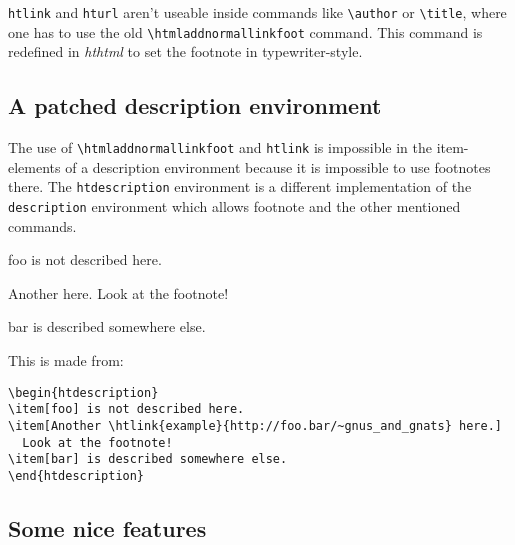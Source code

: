 \documentclass[11pt,a4paper]{article}
\begin{document}
\verb|htlink| and \verb|hturl| aren't useable inside commands like
\verb|\author| or \verb|\title|, where one has to use the old
\verb|\htmladdnormallinkfoot| command.  This command is redefined in
\emph{hthtml} to set the footnote in typewriter-style.

\subsection{A patched description environment}

The use of \verb|\htmladdnormallinkfoot| and \verb|htlink| is
impossible in the item-elements of a description environment because
it is impossible to use footnotes there.  The \verb|htdescription|
environment is a different implementation of the \verb|description|
environment which allows footnote and the other mentioned commands.

\begin{htdescription}
\item[foo] is not described here.
\item[Another \htlink{example}{http://foo.bar/~gnus_and_gnats} here.]
  Look at the footnote!
\item[bar] is described somewhere else.
\end{htdescription}

This is made from:
\begin{verbatim}
\begin{htdescription}
\item[foo] is not described here.
\item[Another \htlink{example}{http://foo.bar/~gnus_and_gnats} here.]
  Look at the footnote!
\item[bar] is described somewhere else.
\end{htdescription}
\end{verbatim}

\subsection{Some nice features}
\end{document}
